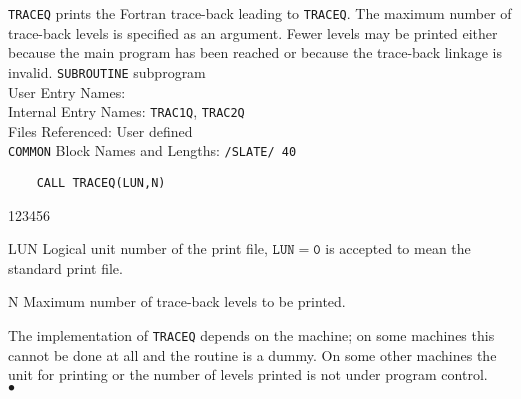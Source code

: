                         
                          
\Submitter{}                              
                         
{\tt TRACEQ} prints the Fortran trace-back leading to
{\tt TRACEQ}. The maximum number of trace-back levels is specified as an
argument. Fewer levels may be printed either because the main program
has been reached or because the trace-back linkage is invalid.
\Structure
{\tt SUBROUTINE} subprogram \\
User Entry Names: \\
Internal Entry Names: {\tt TRAC1Q}, {\tt TRAC2Q}\\
Files Referenced: User defined\\
{\tt COMMON} Block Names and Lengths: {\tt /SLATE/ 40}
\Usage
\begin{verbatim}
    CALL TRACEQ(LUN,N)
\end{verbatim}
\begin{DLtt}{123456}
\item [LUN] Logical unit number of the print file, $\mathtt{LUN=0}$ is
accepted to mean the standard print file.
\item [N] Maximum number of trace-back levels to be printed.
\end{DLtt}
\Notes
The implementation of {\tt TRACEQ} depends on the machine; on some
machines this cannot be done at all and the routine is a dummy. On some
other machines the unit for printing or the number of levels printed is
not under program control.
\\ $\bullet$
